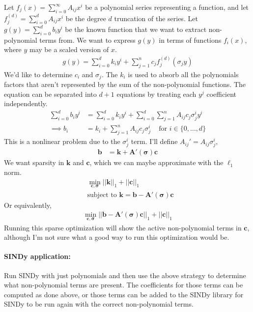 \documentclass{article}
\let\vec\mathbf
\begin{document}
Let $f_j(x) = \sum_{i=0}^\infty A_{ij} x^i$ be a polynomial series representing a function,
and let $f_j^{(d)} = \sum_{i=0}^d A_{ij} x^i$ be the degree $d$ truncation of
the series. Let $g(y) = \sum_{i=0}^d b_i y^i$ be the known function that we want
to extract non-polynomial terms from. We want to express $g(y)$ in terms of
functions $f_i(x)$, where $y$ may be a scaled version of $x$.
\begin{align*}
g(y) = \sum_{i=0}^d k_i y^i + \sum_{j=1}^n c_j f_j^{(d)}(\sigma_j y)
\end{align*}
We'd like to determine $c_i$ and $\sigma_j$. The $k_i$ is used to absorb all the
polynomials factors that aren't represented by the sum of the non-polynomial
functions. The equation can be separated into $d+1$ equations by treating each
$y^j$ coefficient independently.
\begin{align*}
\sum_{i=0}^d b_i y^i &= \sum_{i=0}^d k_i y^i + \sum_{i=0}^d \sum_{j=1}^n A_{ij} c_j \sigma_j^i y^i
\\ \implies b_i &= k_i + \sum_{j=1}^n A_{ij} c_j \sigma_j^i
\,\,\,\,\, \text{ for $i \in \{0, \hdots, d\}$}
\end{align*}
This is a nonlinear problem due to the $\sigma_j^i$ term. I'll define $A_{ij}' = A_{ij} \sigma^i_j$,
\begin{align*}
\vec{b} &= \vec{k} + \vec{A}'(\vec{\sigma}) \vec{c}
\end{align*}
We want sparsity in $\vec{k}$ and $\vec{c}$, which we can maybe approximate with
the $\ell_1$ norm.
\begin{align*}
&\min_{\vec{c},\vec{\sigma}} ||\vec{k}||_1 + ||\vec{c}||_1
\\& \text{subject to } \vec{k} =  \vec{b} - \vec{A}'(\vec{\sigma})\vec{c}
\end{align*}
Or equivalently,
\begin{align*}
\min_{\vec{c},\vec{\sigma}} ||\vec{b} - \vec{A}'(\vec{\sigma})\vec{c}||_1 + ||\vec{c}||_1
\end{align*}
Running this sparse optimization will show the active non-polynomial terms in
$\vec{c}$, although I'm not sure what a good way to run this optimization would
be.

\paragraph{SINDy application:} Run SINDy with just polynomials and then use the
above strategy to determine what non-polynomial terms are present. The
coefficients for those terms can be computed as done above, or those terms can
be added to the SINDy library for SINDy to be run again with the correct
non-polynomial terms.
\end{document}
